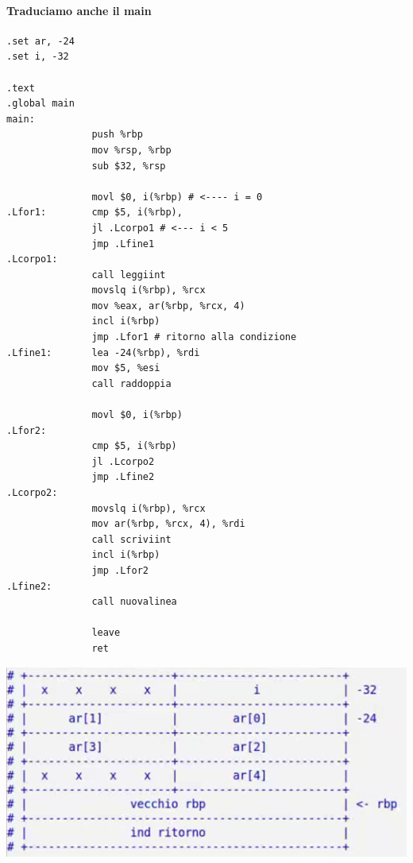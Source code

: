 \documentclass[11pt]{report}
\theoremstyle{definition}
\begin{document}
\paragraph{Traduciamo anche il main}
\begin{verbatim}
.set ar, -24
.set i, -32

.text
.global main
main:
               push %rbp
               mov %rsp, %rbp
               sub $32, %rsp
               
               movl $0, i(%rbp) # <---- i = 0
.Lfor1:        cmp $5, i(%rbp), 
               jl .Lcorpo1 # <--- i < 5
               jmp .Lfine1
.Lcorpo1:
               call leggiint
               movslq i(%rbp), %rcx
               mov %eax, ar(%rbp, %rcx, 4)
               incl i(%rbp)
               jmp .Lfor1 # ritorno alla condizione 
.Lfine1:       lea -24(%rbp), %rdi
               mov $5, %esi
               call raddoppia
               
               movl $0, i(%rbp)
.Lfor2:
               cmp $5, i(%rbp)
               jl .Lcorpo2
               jmp .Lfine2
.Lcorpo2:
               movslq i(%rbp), %rcx
               mov ar(%rbp, %rcx, 4), %rdi
               call scriviint
               incl i(%rbp)
               jmp .Lfor2
.Lfine2:
               call nuovalinea
               
               leave
               ret
\end{verbatim}\begin{center}
\includegraphics[scale=.9]{img/23.PNG}
\end{center} 
\end{document}
